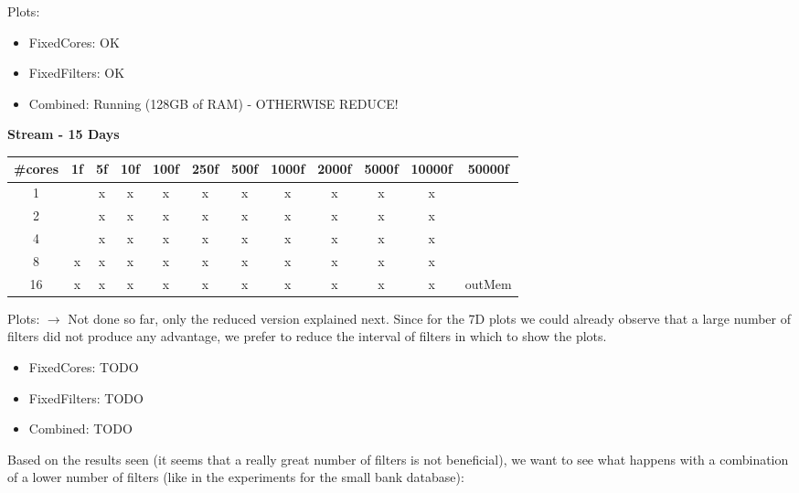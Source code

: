 \documentclass[12pt,a4paper]{article}
\begin{document}
Plots:
\begin{itemize}
    \item FixedCores: OK
    \item FixedFilters: OK
    \item Combined: Running (128GB of RAM) - OTHERWISE REDUCE!
\end{itemize}



\textbf{Stream - 15 Days}
\begin{table}[H]
  \begin{tabular}{|c|c|c|c|c|c|c|c|c|c|c|c|}
  \hline
  \#cores & 1f & 5f & 10f & 100f & 250f & 500f & 1000f & 2000f & 5000f & 10000f & 50000f \\ \hline
  1       &   & x & x & x & x & x & x & x & x & x &        \\ \hline
  2       &   & x & x & x & x & x & x & x & x & x &        \\ \hline
  4       &   & x & x & x & x & x & x & x & x & x &       \\ \hline
  8       & x & x & x & x & x & x & x & x & x & x &        \\ \hline
  16      & x & x & x & x & x & x & x & x & x & x & outMem \\ \hline
  \end{tabular}
\end{table}

Plots:
$\rightarrow$ Not done so far, only the reduced version explained next. Since for the 7D plots
we could already observe that a large number of filters did not produce any advantage, we prefer
to reduce the interval of filters in which to show the plots.
\begin{itemize}
    \item FixedCores: TODO
    \item FixedFilters: TODO
    \item Combined: TODO
\end{itemize}
  

Based on the results seen (it seems that a really great number of filters is not beneficial), we want to see what happens with a combination of a lower number of filters (like in the experiments for the small bank database):
\end{document}
